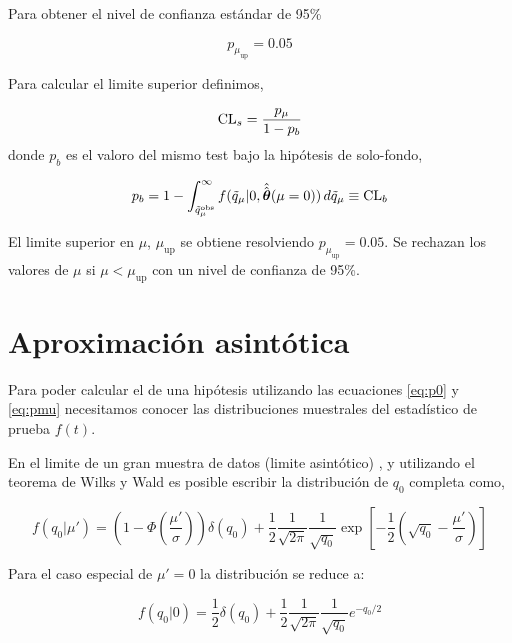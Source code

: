 Para obtener el nivel de confianza estándar de 95\%

\begin{equation}
  p_{\mu_\text{up}} = 0.05
\end{equation}

Para calcular el limite superior {\cls} definimos,

\begin{equation}
  \text{CL}_s = \frac{p_\mu}{1-p_b}
\end{equation}
%
donde $p_b$ es el valoro del mismo test bajo la hipótesis de solo-fondo,

\begin{equation}
  p_b = 1 - \int_{\tilde{q}_\mu^\text{obs}}^{\infty}
  f(\tilde{q}_\mu|0,\hat{\hat{\bm{\theta}}}(\mu=0)) \, d\tilde{q}_\mu \equiv \text{CL}_b
\end{equation}


El limite superior {\cls} en $\mu$, $\mu_\text{up}$ se obtiene resolviendo
$p_{\mu_\text{up}} = 0.05$. Se rechazan los valores de $\mu$ si $\mu <
\mu_\text{up}$ con un nivel de confianza de 95\%.

\section{Aproximación asintótica}

Para poder calcular el {\pvalue} de una hipótesis utilizando las ecuaciones
\eqref{eq:p0} y \eqref{eq:pmu} necesitamos conocer las distribuciones muestrales
del estadístico de prueba $f(t)$.

En el limite de un gran muestra de datos (limite asintótico) \cite{AsymAprox}, y
utilizando el teorema de Wilks\cite{WilksTheo} y Wald\cite{WaldTheo} es posible
escribir la distribución de $q_0$ completa como,

\begin{equation}
  f(q_0|\mu') = \left( 1 - \Phi\left(\frac{\mu'}{\sigma}\right)\right)
  \delta(q_0) + \frac{1}{2}\frac{1}{\sqrt{2\pi}}\frac{1}{\sqrt{q_0}} \exp \left[
    -\frac{1}{2} \left( \sqrt{q_0} - \frac{\mu'}{\sigma} \right)\right]
\end{equation}

Para el caso especial de $\mu' = 0$ la distribución se reduce a:

\begin{equation}
  f(q_0|0) = \frac{1}{2} \delta(q_0) +
  \frac{1}{2}\frac{1}{\sqrt{2\pi}}\frac{1}{\sqrt{q_0}} e^{-q_0/2}
\end{equation}

